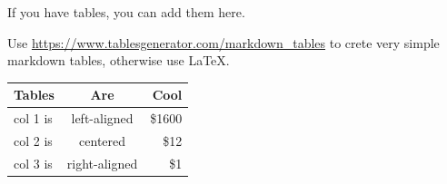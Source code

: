 \documentclass[mstat,12pt]{unswthesis}
\begin{document}
If you have tables, you can add them here.

Use \url{https://www.tablesgenerator.com/markdown_tables} to crete very
simple markdown tables, otherwise use \LaTeX.

\begin{longtable}[]{@{}lcr@{}}
\toprule\noalign{}
Tables & Are & Cool \\
\midrule\noalign{}
\endhead
\bottomrule\noalign{}
\endlastfoot
col 1 is & left-aligned & \$1600 \\
col 2 is & centered & \$12 \\
col 3 is & right-aligned & \$1 \\
\end{longtable}
\end{document}
